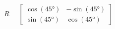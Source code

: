 \documentclass[preview]{standalone}
\begin{document}
\begin{align*}
R = \begin{bmatrix} \cos(45°) & -\sin(45°) \\ \sin(45°) & \cos(45°) \end{bmatrix}
\end{align*}
\end{document}
